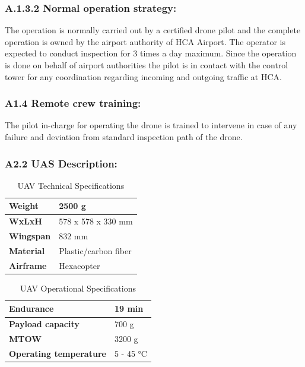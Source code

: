 \documentclass[../Head/Main.tex]{subfiles}
\begin{document}
\subsubsection*{A.1.3.2 Normal operation strategy:}
The operation is normally carried out by a certified drone pilot and the complete operation is owned by the airport authority of HCA Airport. The operator is expected to conduct inspection for 3 times a day maximum. Since the operation is done on behalf of airport authorities the pilot is in contact with the control tower for any coordination regarding incoming and outgoing traffic at HCA.
\subsubsection*{A1.4 Remote crew training:}
The pilot in-charge for operating the drone is trained to intervene in case of any failure and deviation from standard inspection path of the drone.
\subsubsection*{A2.2 UAS Description:}
\begin{table}[H]
\centering
\caption{UAV Technical Specifications}
\label{tab:my-table}
\begin{tabular}{|l|l|}
\hline
\textbf{Weight}   & 2500 g               \\ \hline
\textbf{WxLxH}    & 578 x 578 x 330 mm   \\ \hline
\textbf{Wingspan} & 832 mm               \\ \hline
\textbf{Material} & Plastic/carbon fiber \\ \hline
\textbf{Airframe} & Hexacopter           \\ \hline
\end{tabular}
\end{table}


\begin{table}[H]
\centering
\caption{UAV Operational Specifications}
\label{tab:my-table}
\begin{tabular}{|l|l|}
\hline
\textbf{Endurance}             & 19 min    \\ \hline
\textbf{Payload capacity}      & 700 g     \\ \hline
\textbf{MTOW}                  & 3200 g    \\ \hline
\textbf{Operating temperature} & 5 - 45 °C \\ \hline
\end{tabular}
\end{table}
\end{document}
